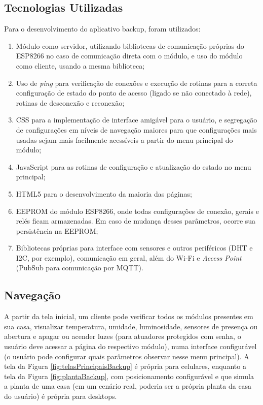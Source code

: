 \subsection{Tecnologias Utilizadas}

Para o desenvolvimento do aplicativo backup, foram utilizados:

\begin{enumerate}
	\item Módulo como servidor, utilizando bibliotecas de comunicação próprias do ESP8266 no caso de comunicação direta com o módulo, e uso do módulo como cliente, usando a mesma biblioteca;
	\item Uso de \emph{ping} para verificação de conexões e execução de rotinas para a correta configuração de estado do ponto de acesso (ligado se não conectado à rede), rotinas de desconexão e reconexão;
	\item CSS para a implementação de interface amigável para o usuário, e segregação de configurações em níveis de navegação maiores para que configurações mais usadas sejam mais facilmente acessíveis a partir do menu principal do módulo;
	\item JavaScript para as rotinas de configuração e atualização do estado no menu principal;
	\item HTML5 para o desenvolvimento da maioria das páginas;
	\item EEPROM do módulo ESP8266, onde todas configurações de conexão, gerais e relés ficam armazenadas. Em caso de mudança desses parâmetros, ocorre sua persistência na EEPROM;
	\item Bibliotecas próprias para interface com sensores e outros periféricos (DHT e I2C, por exemplo), comunicação em geral, além do Wi-Fi e \emph{Access Point} (PubSub para comunicação por MQTT).
\end{enumerate}

\subsection{Navegação}

A partir da tela inicial, um cliente pode verificar todos os módulos presentes em sua casa, visualizar temperatura, umidade, luminosidade, sensores de presença ou abertura e apagar ou acender luzes (para atuadores protegidos com senha, o usuário deve acessar a página do respectivo módulo), numa interface configurável (o usuário pode configurar quais parâmetros observar nesse menu principal). A tela da Figura \ref{fig:telasPrincipaisBackup} é própria para celulares, enquanto a tela da Figura \ref{fig:plantaBackup}, com posicionamento configurável e que simula a planta de uma casa (em um cenário real, poderia ser a própria planta da casa do usuário) é própria para desktops.

